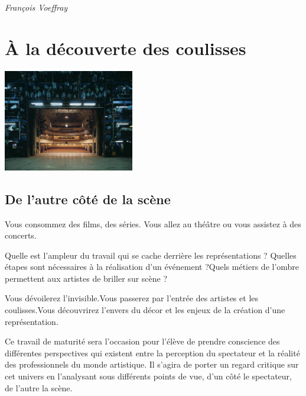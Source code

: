 \documentclass[
  10pt,
  french,
  a5paper,
  openany]{book}
\newenvironment{signature}{\begin{flushright}}{\end{flushright}}
\begin{document}
\begin{signature}
\emph{François Voeffray}

\end{signature}

\hypertarget{aux300-la-deux301couverte-des-coulisses}{%
\chapter{À la découverte des coulisses}\label{aux300-la-deux301couverte-des-coulisses}}

\begin{center}
\includegraphics[width=\textwidth,height=12em]{images/a-la-decouverte-des-coulisses.jpg}

\end{center}

\hypertarget{de-lautre-coux302teux301-de-la-sceux300ne}{%
\section*{De l'autre côté de la scène}\label{de-lautre-coux302teux301-de-la-sceux300ne}}

Vous consommez des films, des séries. Vous allez au théâtre ou vous assistez à des concerts.

Quelle est l'ampleur du travail qui se cache derrière les représentations ? Quelles étapes sont nécessaires à la réalisation d'un événement ?Quels métiers de l'ombre permettent aux artistes de briller sur scène ?

Vous dévoilerez l'invisible.Vous passerez par l'entrée des artistes et les coulisses.Vous découvrirez l'envers du décor et les enjeux de la création d'une représentation.

Ce travail de maturité sera l'occasion pour l'élève de prendre conscience des différentes perspectives qui existent entre la perception du spectateur et la réalité des professionnels du monde artistique. Il s'agira de porter un regard critique sur cet univers en l'analysant sous différents points de vue, d'un côté le spectateur, de l'autre la scène.
\end{document}

